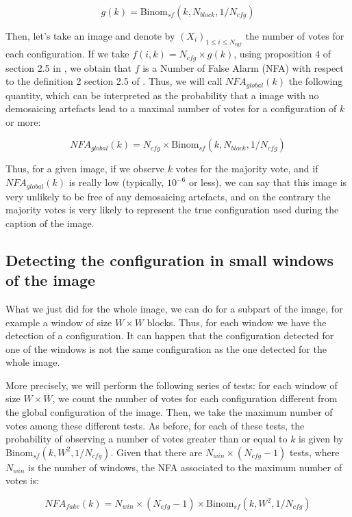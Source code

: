 \documentclass[sigconf, nonacm]{acmart}
\begin{document}
$$
g(k) = \text{Binom}_{sf}(k, N_{block}, 1/ N_{cfg})
$$

Then, let's take an image and denote by $(X_i)_{1 \le i \le N_{cgf}}$ the number of votes for each configuration. If we take $f(i, k) = N_{cfg} \times g(k)$, using proposition 4 of section 2.5 in \cite{morel_detection_2021}, we obtain that $f$ is a Number of False Alarm (NFA) with respect to the definition 2 section 2.5 of \cite{morel_detection_2021}. Thus, we will call $NFA_{global}(k)$ the following quantity, which can be interpreted as the probability that a image with no demosaicing artefacts lead to a maximal number of votes for a configuration of $k$ or more: 

$$
NFA_{global}(k) = N_{cfg} \times \text{Binom}_{sf}(k, N_{block}, 1/ N_{cfg})
$$

Thus, for a given image, if we observe $k$ votes for the majority vote, and if $NFA_{global}(k)$ is really low (typically, $10^{-6}$ or less), we can say that this image is very unlikely to be free of any demosaicing artefacts, and on the contrary the majority votes is very likely to represent the true configuration used during the caption of the image.

\subsection{Detecting the configuration in small windows of the image} \label{sec:local_a_contrario}

What we just did for the whole image, we can do for a subpart of the image, for example a window of size $W \times W$ blocks. Thus, for each window we have the detection of a configuration. It can happen that the configuration detected for one of the windows is not the same configuration as the one detected for the whole image.

More precisely, we will perform the following series of tests: for each window of size $W \times W$, we count the number of votes for each configuration different from the global configuration of the image. Then, we take the maximum number of votes among these different tests. As before, for each of these tests, the probability of observing a number of votes greater than or equal to $k$ is given by $\text{Binom}_{sf}(k, W^2, 1/ N_{cfg})$. Given that there are $N_{win} \times (N_{cfg} - 1)$ tests, where $N_{win}$ is the number of windows, the NFA associated to the maximum number of votes is:

$$
NFA_{fake}(k) = N_{win} \times (N_{cfg} - 1) \times \text{Binom}_{sf}(k, W^2, 1/ N_{cfg})
$$
\end{document}
